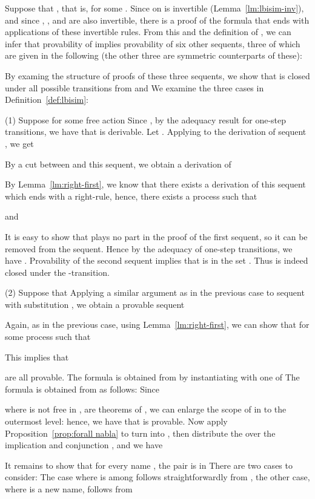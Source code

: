 \documentclass{acmtrans2m}
\begin{document}
Suppose that , that is, 
 for some . 
Since  on  is invertible (Lemma~\ref{lm:lbisim-inv}), and since
, ,  and  are also invertible, there is a proof of the formula that ends 
with applications of these invertible rules. From this and the definition of , 
we can infer that provability of 
implies provability of six other sequents, three of which are given 
in the following (the other three are symmetric counterparts of these):

By examing the structure of proofs of these three sequents, we show 
that  is closed under all possible transitions from  and 
We examine the three cases in Definition~\ref{def:lbisim}:

\noindent (1) Suppose  for some free action  
Since , by the adequacy result for one-step transitions,
we have that  is derivable.
Let . Applying  to the derivation
of sequent , we get 

By a cut between  and this sequent,
we obtain a derivation of 

By Lemma~\ref{lm:right-first}, we know that there exists a derivation of this sequent
which ends with a right-rule, hence, there exists a process  such that

and

It is easy to show that  plays no part in the proof of the first sequent,
so it can be removed from the sequent. Hence by the adequacy of one-step transitions,
we have . Provability of the second sequent implies
that  is in the set .  Thus
 is indeed closed under the -transition.

\noindent(2) Suppose that 
Applying a similar argument as in the previous case to sequent  with
substitution ,
we obtain a provable sequent 

Again, as in the previous case, using Lemma~\ref{lm:right-first}, we can show that
 for some process  such that

This implies that 

are all provable.
The formula  is obtained from  by instantiating  with one of 
The formula  is obtained from  as follows:
Since 

where  is not free in , are theorems of , 
we can enlarge the scope of  in  to the outermost level:
hence, we have that 
is provable. Now apply Proposition~\ref{prop:forall nabla} to turn  into , then distribute
the  over the implication  and conjunction , and we have 

It remains to show that for every name , the pair
 is in  There are two cases to consider:
The case where  is among  follows straightforwardly from ,
the other case, where  is a new name, follows from 
\end{document}
